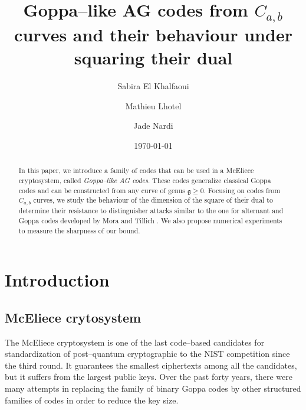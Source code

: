 \documentclass[a4paper]{amsart}
\title{Goppa--like AG codes from $C_{a,b}$ curves and their behaviour under squaring their dual}
\author{Sabira El Khalfaoui}
\author{Mathieu Lhotel}
\author{Jade Nardi}
\date{\today}
\theoremstyle{definition}
\theoremstyle{remark}
\begin{document}
\maketitle

\begin{abstract}
In this paper, we introduce a family of codes that can be used in a McEliece cryptosystem, called \emph{Goppa--like AG codes}. These codes generalize classical Goppa codes and can be constructed from any curve of genus $\mathfrak{g} \geq 0$. Focusing on codes from $C_{a,b}$ curves, we study the behaviour of the dimension of the square of their dual to determine their resistance to distinguisher attacks similar to the one for alternant and Goppa codes developed by Mora and Tillich \cite{MT21}. We also propose numerical experiments to measure the sharpness of our bound.
\end{abstract}
 

\section*{Introduction}

\subsection*{McEliece crytosystem}
The McEliece cryptosystem is one of the last code--based candidates for standardization of post--quantum cryptographic to the NIST competition since the third round. It guarantees the smallest ciphertexts among all the candidates, but it suffers from the largest public keys. Over the past forty years, there were many attempts in replacing the family of binary Goppa codes by other structured families of codes in order to reduce the key size.
\end{document}

